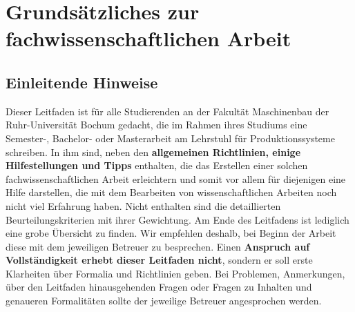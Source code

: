 
\chapter{Grundsätzliches zur fachwissenschaftlichen Arbeit}
\label{cap:Grundsätzliches zur fachwissenschaftlichen Arbeit}

\section{Einleitende Hinweise}
\label{sec:Einleitende Hinweise}

Dieser Leitfaden ist für alle Studierenden an der Fakultät Maschinenbau der Ruhr-Universität Bochum gedacht, die im Rahmen ihres Studiums eine Semester-, Bachelor- oder Masterarbeit am Lehrstuhl für Produktionssysteme schreiben. In ihm sind, neben den \textbf{allgemeinen Richtlinien, einige Hilfestellungen und Tipps} enthalten, die das Erstellen einer solchen fachwissenschaftlichen Arbeit erleichtern und somit vor allem für diejenigen eine Hilfe darstellen, die mit dem Bearbeiten von wissenschaftlichen Arbeiten noch nicht viel Erfahrung haben. Nicht enthalten sind die detaillierten Beurteilungskriterien mit ihrer Gewichtung. Am Ende des Leitfadens ist lediglich eine grobe Übersicht zu finden. Wir empfehlen deshalb, bei Beginn der Arbeit diese mit dem jeweiligen Betreuer zu besprechen. Einen\textbf{ Anspruch auf Vollständigkeit erhebt dieser Leitfaden nicht}, sondern er soll erste Klarheiten über Formalia und Richtlinien geben.
Bei Problemen, Anmerkungen, über den Leitfaden hinausgehenden Fragen oder Fragen zu Inhalten und genaueren Formalitäten sollte der jeweilige Betreuer angesprochen werden.


